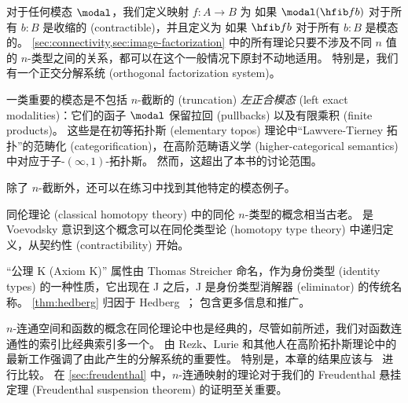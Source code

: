 对于任何模态 $\modal$，我们定义映射 $f:A\to B$ 为 %
%
如果 $\modal(\hfib f b)$ 对于所有 $b:B$ 是收缩的 (contractible)，并且定义为 %
%
如果 $\hfib f b$ 对于所有 $b:B$ 是模态的。
\cref{sec:connectivity,sec:image-factorization} 中的所有理论只要不涉及不同 $n$ 值的 $n$-类型之间的关系，都可以在这个一般情况下原封不动地适用。
%
%
特别是，我们有一个正交分解系统 (orthogonal factorization system)。

一类重要的模态是不包括 $n$-截断的 (truncation) \emph{左正合模态} (left exact modalities)：它们的函子 $\modal$ 保留拉回 (pullbacks) 以及有限乘积 (finite products)。
%
这些是在初等拓扑斯 (elementary topos) 理论中“Lawvere-Tierney 拓扑”的范畴化 (categorification)，在高阶范畴语义学 (higher-categorical semantics) 中对应于子-$(\infty,1)$-拓扑斯。
%
然而，这超出了本书的讨论范围。

除了 $n$-截断外，还可以在练习中找到其他特定的模态例子。


\sectionNotes

同伦理论 (classical homotopy theory) 中的同伦 $n$-类型的概念相当古老。
是 Voevodsky 意识到这个概念可以在同伦类型论 (homotopy type theory) 中递归定义，从契约性 (contractibility) 开始。

%
“公理 K (Axiom K)” 属性由 Thomas Streicher 命名，作为身份类型 (identity types) 的一种性质，它出现在 J 之后，J 是身份类型消解器 (eliminator) 的传统名称。
\cref{thm:hedberg} 归因于 Hedberg~\cite{hedberg1998coherence}；\cite{krausgeneralizations} 包含更多信息和推广。

$n$-连通空间和函数的概念在同伦理论中也是经典的，尽管如前所述，我们对函数连通性的索引比经典索引多一个。
由 Rezk、Lurie 和其他人在高阶拓扑斯理论中的最新工作强调了由此产生的分解系统的重要性。%
特别是，本章的结果应该与~\cite[\S6.5.1]{lurie:higher-topoi} 进行比较。
在 \cref{sec:freudenthal} 中，$n$-连通映射的理论对于我们的 Freudenthal 悬挂定理 (Freudenthal suspension theorem) 的证明至关重要。

